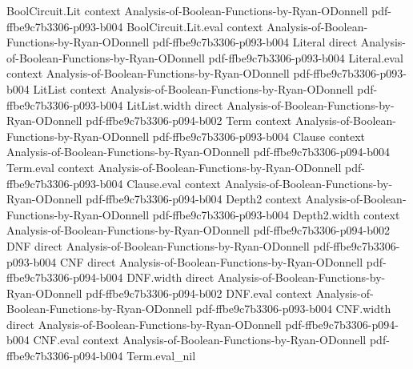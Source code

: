 \begin{lemma}
\label{BoolFourier.char_S_times_char_T}
\leanok
{}
\proofstep
  {BoolCircuit.Lit}
  {context}
  {Analysis-of-Boolean-Functions-by-Ryan-ODonnell}
  {pdf-ffbe9c7b3306-p093-b004}
\proofstep
  {BoolCircuit.Lit.eval}
  {context}
  {Analysis-of-Boolean-Functions-by-Ryan-ODonnell}
  {pdf-ffbe9c7b3306-p093-b004}
\proofstep
  {Literal}
  {direct}
  {Analysis-of-Boolean-Functions-by-Ryan-ODonnell}
  {pdf-ffbe9c7b3306-p093-b004}
\proofstep
  {Literal.eval}
  {context}
  {Analysis-of-Boolean-Functions-by-Ryan-ODonnell}
  {pdf-ffbe9c7b3306-p093-b004}
\proofstep
  {LitList}
  {context}
  {Analysis-of-Boolean-Functions-by-Ryan-ODonnell}
  {pdf-ffbe9c7b3306-p093-b004}
\proofstep
  {LitList.width}
  {direct}
  {Analysis-of-Boolean-Functions-by-Ryan-ODonnell}
  {pdf-ffbe9c7b3306-p094-b002}
\proofstep
  {Term}
  {context}
  {Analysis-of-Boolean-Functions-by-Ryan-ODonnell}
  {pdf-ffbe9c7b3306-p093-b004}
\proofstep
  {Clause}
  {context}
  {Analysis-of-Boolean-Functions-by-Ryan-ODonnell}
  {pdf-ffbe9c7b3306-p094-b004}
\proofstep
  {Term.eval}
  {context}
  {Analysis-of-Boolean-Functions-by-Ryan-ODonnell}
  {pdf-ffbe9c7b3306-p093-b004}
\proofstep
  {Clause.eval}
  {context}
  {Analysis-of-Boolean-Functions-by-Ryan-ODonnell}
  {pdf-ffbe9c7b3306-p094-b004}
\proofstep
  {Depth2}
  {context}
  {Analysis-of-Boolean-Functions-by-Ryan-ODonnell}
  {pdf-ffbe9c7b3306-p093-b004}
\proofstep
  {Depth2.width}
  {context}
  {Analysis-of-Boolean-Functions-by-Ryan-ODonnell}
  {pdf-ffbe9c7b3306-p094-b002}
\proofstep
  {DNF}
  {direct}
  {Analysis-of-Boolean-Functions-by-Ryan-ODonnell}
  {pdf-ffbe9c7b3306-p093-b004}
\proofstep
  {CNF}
  {direct}
  {Analysis-of-Boolean-Functions-by-Ryan-ODonnell}
  {pdf-ffbe9c7b3306-p094-b004}
\proofstep
  {DNF.width}
  {direct}
  {Analysis-of-Boolean-Functions-by-Ryan-ODonnell}
  {pdf-ffbe9c7b3306-p094-b002}
\proofstep
  {DNF.eval}
  {context}
  {Analysis-of-Boolean-Functions-by-Ryan-ODonnell}
  {pdf-ffbe9c7b3306-p093-b004}
\proofstep
  {CNF.width}
  {direct}
  {Analysis-of-Boolean-Functions-by-Ryan-ODonnell}
  {pdf-ffbe9c7b3306-p094-b004}
\proofstep
  {CNF.eval}
  {context}
  {Analysis-of-Boolean-Functions-by-Ryan-ODonnell}
  {pdf-ffbe9c7b3306-p094-b004}
\proofstep
  {Term.eval_nil}

\end{lemma}
